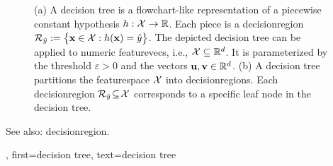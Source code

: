 {{\begin{figure}[H]
\begin{minipage}{.45\textwidth}
		\end{minipage}
		\caption{(a) A decision tree is a flowchart-like representation of a piecewise constant \gls{hypothesis} $h: \mathcal{X} \rightarrow \mathbb{R}$.  
		Each piece is a \gls{decisionregion} $\mathcal{R}_{\hat{y}} := \big\{ {\bf x} \in  \mathcal{X}: h({\bf x}) = \hat{y} \big\}$. 
		The depicted decision tree can be applied to numeric \glspl{featurevec}, i.e., $\mathcal{X} \subseteq \mathbb{R}^{d}$. It is parameterized 
		by the threshold $\varepsilon>0$ and the \glspl{vector} ${\bf u}, {\bf v} \in \mathbb{R}^{d}$. 
		(b) A decision tree partitions the \gls{featurespace} $\mathcal{X}$ into \glspl{decisionregion}. Each \gls{decisionregion}  
		$\mathcal{R}_{\hat{y}} \!\subseteq\!\mathcal{X}$ corresponds to a specific leaf node in the decision tree.}
		\label{fig_decision_tree_dict}
		\end{figure} 
		See also: \gls{decisionregion}.},
	  first={decision tree},
	  text={decision tree} 
}


